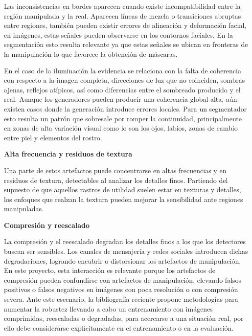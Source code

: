 Las inconsistencias en bordes aparecen cuando existe incompatibilidad entre la región manipulada y la real. Aparecen líneas de mezcla o transiciones abruptas entre regiones, también pueden existir errores de alineación y deformación facial, en imágenes, estas señales pueden observarse en los contornos faciales. En la segmentación esto resulta relevante ya que estas señales se ubican en fronteras de la manipulación lo que favorece la obtención de máscaras\parencite{Amerini2025, Jiang2025}.

En el caso de la iluminación la evidencia se relaciona con la falta de coherencia con respecto a la imagen completa, direcciones de luz que no coinciden, sombras ajenas, reflejos atípicos, así como diferencias entre el sombreado producido y el real. Aunque los generadores pueden producir una coherencia global alta, aún existen casos donde la generación introduce errores locales. Para un segmentador esto resulta un patrón que sobresale por romper la continuidad, principalmente en zonas de alta variación visual como lo son los ojos, labios, zonas de cambio entre piel y elementos del rostro\parencite{Amerini2025, MurguiaSerranoJY2025}.

\medskip\textbf{Alta frecuencia y residuos de textura}

Una parte de estos artefactos puede concentrarse en altas frecuencias y en residuos de textura, detectables al analizar los detalles finos. Partiendo del supuesto de que aquellos rastros de utilidad suelen estar en texturas y detalles, los enfoques que realzan la textura pueden mejorar la sensibilidad ante regiones manipuladas\parencite{Jiang2025, Jin2025, Qiao2025}.

\medskip\textbf{Compresión y reescalado}

La compresión y el reescalado degradan los detalles finos a los que los detectores buscan ser sensibles. Los canales de mensajería y redes sociales introducen dichas degradaciones, logrando encubrir o distorsionar los artefactos de manipulación. En este proyecto, esta interacción es relevante porque los artefactos de compresión pueden confundirse con artefactos de manipulación, elevando falsos positivos o falsos negativos en imágenes con poca resolución o con compresión severa. Ante este escenario, la bibliografía reciente propone metodologías para aumentar la robustez llevando a cabo un entrenamiento con imágenes comprimidas, reescaladas o degradadas, para acercarse a una situación real, por ello debe considerarse explícitamente en el entrenamiento o en la evaluación\parencite{Gao2024, LiM2025}. 


